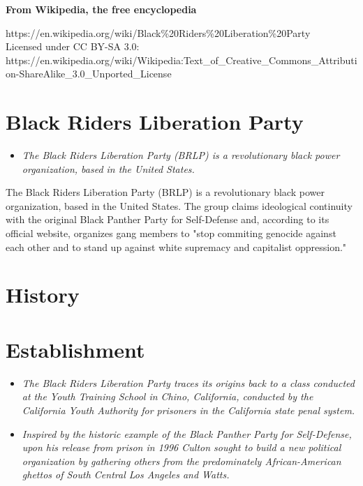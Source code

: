 \textbf{From Wikipedia, the free encyclopedia}

https://en.wikipedia.org/wiki/Black\%20Riders\%20Liberation\%20Party\\
Licensed under CC BY-SA 3.0:\\
https://en.wikipedia.org/wiki/Wikipedia:Text\_of\_Creative\_Commons\_Attribution-ShareAlike\_3.0\_Unported\_License

\section{Black Riders Liberation
Party}\label{black-riders-liberation-party}

\begin{itemize}
\item
  \emph{The Black Riders Liberation Party (BRLP) is a revolutionary
  black power organization, based in the United States.}
\end{itemize}

The Black Riders Liberation Party (BRLP) is a revolutionary black power
organization, based in the United States. The group claims ideological
continuity with the original Black Panther Party for Self-Defense and,
according to its official website, organizes gang members to "stop
commiting genocide against each other and to stand up against white
supremacy and capitalist oppression."

\section{History}\label{history}

\section{Establishment}\label{establishment}

\begin{itemize}
\item
  \emph{The Black Riders Liberation Party traces its origins back to a
  class conducted at the Youth Training School in Chino, California,
  conducted by the California Youth Authority for prisoners in the
  California state penal system.}
\item
  \emph{Inspired by the historic example of the Black Panther Party for
  Self-Defense, upon his release from prison in 1996 Culton sought to
  build a new political organization by gathering others from the
  predominately African-American ghettos of South Central Los Angeles
  and Watts.}
\end{itemize}

